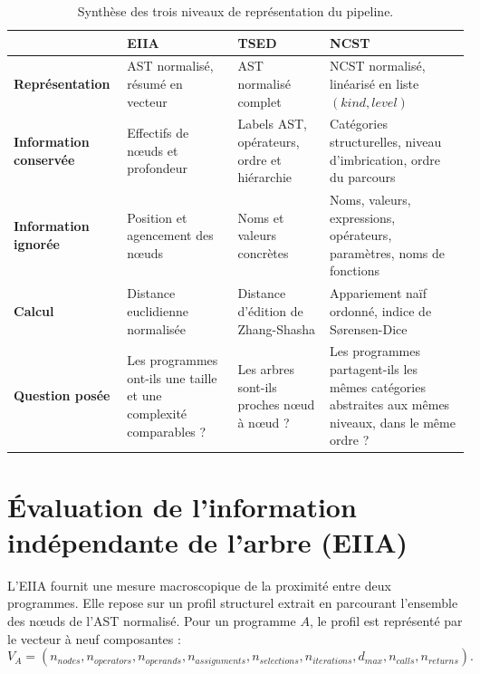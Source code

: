 {\begin{table}[htbp]
\centering
\small
\renewcommand{\arraystretch}{1.25}
\begin{tabularx}{\textwidth}{>{\bfseries}p{2.6cm}XXX}
\toprule
 & \textcolor{eiiacol}{EIIA} & \textcolor{tsedcol}{TSED} & \textcolor{ncstcol}{NCST} \\
\midrule
Représentation & AST normalisé, résumé en vecteur & AST normalisé complet &
  NCST normalisé, linéarisé en liste $(\mathit{kind},\mathit{level})$ \\
Information conservée & Effectifs de nœuds et profondeur &
  Labels AST, opérateurs, ordre et hiérarchie &
  Catégories structurelles, niveau d'imbrication, ordre du parcours \\
Information ignorée & Position et agencement des nœuds &
  Noms et valeurs concrètes &
  Noms, valeurs, expressions, opérateurs, paramètres, noms de fonctions \\
Calcul & Distance euclidienne normalisée &
  Distance d'édition de Zhang-Shasha &
  Appariement naïf ordonné, indice de Sørensen-Dice \\
Question posée & Les programmes ont-ils une taille et une complexité
  comparables ? & Les arbres sont-ils proches nœud à nœud ? &
  Les programmes partagent-ils les mêmes catégories abstraites aux mêmes
  niveaux, dans le même ordre ? \\
\bottomrule
\end{tabularx}
\caption{Synthèse des trois niveaux de représentation du pipeline.}
\label{tab:synthese}
\end{table}

\section{Évaluation de l'information indépendante de l'arbre (EIIA)}

L'EIIA fournit une mesure macroscopique de la proximité entre deux programmes.
Elle repose sur un profil structurel extrait en parcourant l'ensemble des
nœuds de l'AST normalisé. Pour un programme $A$, le profil est représenté par
le vecteur à neuf composantes :
\begin{equation}
V_A = (n_{nodes}, n_{operators}, n_{operands}, n_{assignments},
       n_{selections}, n_{iterations}, d_{max}, n_{calls}, n_{returns}).
\end{equation}

}
